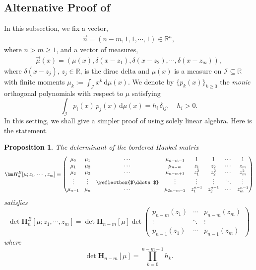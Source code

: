 \documentclass[a4paper,10pt,leqno]{amsart}
\numberwithin{equation}{section}
\newtheorem{proposition}[theorem]{Proposition}
\theoremstyle{remark}
\newcommand{\dd}{\mathrm{d}}
\newcommand{\R}{\mathbb{R}}
\begin{document}
\subsection{Alternative Proof of \cite[Proposition 1.9]{GL}}
\label{sec:mixed-vs-bordered}

In this subsection, we fix a vector,
\begin{align} \label{app bordered hankel vector}
\vec{n} = (n-m, 1, 1, \cdots, 1) \in \R^n,
\end{align}
where $n > m \ge 1$, and a vector of measures,
\begin{align} \label{app bordered hankel measures}
\vec{\mu}(x) = \left( \mu(x), \delta(x - z_1), \delta(x - z_2),  \cdots, \delta(x - z_m) \right),    
\end{align}
where $\delta(x - z_j)$, $z_j \in \R$, is the dirac delta and $\mu(x)$ is a measure on $\mathscr I \subseteq \mathbb R$ with finite moments $\mu_k := \int_{\mathscr I} x^k\,\dd\mu(x)$. We denote by $\{p_k(x)\}_{k\ge0}$ the \textit{monic} orthogonal polynomials with respect to $\mu$ satisfying
\begin{equation}\label{eq:orthog}
\int_{\mathscr I} p_i(x)\, p_j(x)\,\dd\mu(x)=h_i\,\delta_{ij},\quad h_i>0.
\end{equation}
In this setting, we shall give a simpler proof of \cite[Proposition 1.9]{GL} using solely linear algebra. Here is the statement.

\begin{proposition} \label{app bordered hankel prop}
The determinant of the bordered Hankel matrix
\begin{align} \label{borderd hankel defn}
\bm H_n^{B}[\mu;z_1,\cdots,z_m] = \begin{pmatrix}
		\mu_0 & \mu_1 & \cdots & \mu_{n-m-1} & 1 & 1 & \cdots & 1 \\
		\mu_1 & \mu_2 & \cdots & \mu_{n-m} & z_1 & z_2 & \cdots & z_m \\
		\mu_2 & \mu_3 & \cdots & \mu_{n-m+1} & z_1^2 & z_2^2 & \cdots & z_m^2 \\
		\vdots & \vdots & \reflectbox{$\ddots$} & \vdots & \vdots & \vdots & \ddots & \vdots  \\
		\mu_{n-1} & \mu_n & \cdots & \mu_{2n-m-2} & z_1^{n-1} & z_2^{n-1} & \cdots & z_{m}^{n-1}\end{pmatrix}
\end{align}
satisfies
\[
\det\bm H_n^{B}[\mu;z_1,\cdots,z_m] = \det \bm{H}_{n-m}[\mu] \det 
\begin{pmatrix}
	p_{n-m}(z_1) & \cdots & p_{n-m}(z_{m}) \\
	\vdots & \ddots & \vdots \\
	p_{n-1}(z_1) & \cdots & p_{n-1}(z_{m})
\end{pmatrix}
\]
where \[\det \bm{H}_{n-m}[\mu] = \prod_{k=0}^{n-m-1} h_k.\]
\end{proposition}
\end{document}

